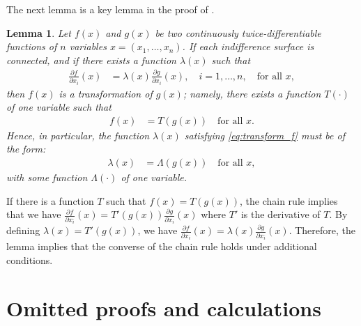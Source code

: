 \documentclass[11pt, a4paper]{article}
\newtheorem{lemma}{Lemma}
\theoremstyle{remark}
\begin{document}
The next lemma is a key lemma in the proof of \citet{lau1982identifying}.
\begin{framed}
\begin{lemma}\label{lemma_1_GU}
    Let $f(x)$ and $g(x)$ be two continuously twice-differentiable functions of $n$ variables $x=(x_1, \dots, x_n)$. If each indifference surface is connected, and if there exists a function $\lambda(x)$ such that
    \begin{align}
    \frac{\partial f}{\partial x_i}(x) &= \lambda(x)\frac{\partial g}{\partial x_i}(x), \quad i=1, \dots, n, \quad \text{for all } x, \label{eq:transform_f}
    \end{align}
    then $f(x)$ is a transformation of $g(x)$; namely, there exists a function $T(\cdot)$ of one variable such that
    \begin{align}
    f(x) &= T(g(x)) \quad \text{for all } x.
    \end{align}
    Hence, in particular, the function $\lambda(x)$ satisfying \eqref{eq:transform_f} must be of the form:
    \begin{align}
        \lambda(x) &= \Lambda(g(x)) \quad \text{for all } x, \label{eq:form_of_lambda}
    \end{align}
    with some function $\Lambda(\cdot)$ of one variable.
\end{lemma}
\end{framed}
If there is a function $T$ such that $f(x) = T(g(x))$, the chain rule implies that we have $\frac{\partial f}{\partial x_i}(x) = T'(g(x))\frac{\partial g}{\partial x_i}(x)$ where $T'$ is the derivative of $T$.
By defining $\lambda(x) = T'(g(x))$, we have $\frac{\partial f}{\partial x_i}(x) = \lambda(x)\frac{\partial g}{\partial x_i}(x)$.
Therefore, the lemma implies that the converse of the chain rule holds under additional conditions.




\section{Omitted proofs and calculations}\label{app:ommitted_proof}
\end{document}
